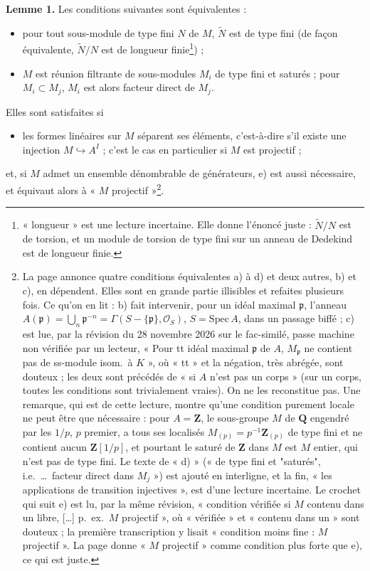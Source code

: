 \documentclass[11pt,a4paper]{article}
\begin{document}
\textbf{Lemme 1.} Les conditions suivantes sont équivalentes :
\begin{itemize}
  \item[a)] pour tout sous-module de type fini $N$ de $M$, $\widetilde{N}$
    est de type fini (de façon équivalente, $\widetilde{N}/N$ est de
    longueur finie\footnote{« longueur » est une lecture incertaine. Elle
    donne l'énoncé juste : $\widetilde{N}/N$ est de torsion, et un module de
    torsion de type fini sur un anneau de Dedekind est de longueur finie.}) ;
  \item[d)] $M$ est réunion filtrante de sous-modules $M_i$ de type fini et
    saturés ; pour $M_i \subset M_j$, $M_i$ est alors facteur direct de
    $M_j$.
\end{itemize}
Elles sont satisfaites si
\begin{itemize}
  \item[e)] les formes linéaires sur $M$ séparent ses éléments,
    c'est-à-dire s'il existe une injection $M \hookrightarrow A^{I}$ ; c'est
    le cas en particulier si $M$ est projectif ;
\end{itemize}
et, si $M$ admet un ensemble dénombrable de générateurs, e) est aussi
nécessaire, et équivaut alors à « $M$ projectif »\footnote{La page annonce
quatre conditions équivalentes a) à d) et deux autres, b) et c), en
dépendent. Elles sont en grande partie illisibles et refaites plusieurs
fois. Ce qu'on en lit : b) fait intervenir, pour un idéal maximal
$\mathfrak{p}$, l'anneau $A(\mathfrak{p}) = \bigcup_n \mathfrak{p}^{-n} =
\Gamma(S - \{\mathfrak{p}\}, \mathcal{O}_S)$, $S = \mathrm{Spec}\,A$, dans un
passage biffé ; c) est lue, par la révision du 28 novembre 2026 sur le fac-similé, passe machine non vérifiée par un lecteur, « Pour tt
idéal maximal $\mathfrak{p}$ de $A$, $M_{\mathfrak{p}}$ ne contient pas de
ss-module isom.\ à $K$ », où « tt » et la négation, très abrégée, sont
douteux ; les deux sont précédés de « si $A$ n'est pas un corps »
(sur un corps, toutes les conditions sont trivialement vraies). On ne les
reconstitue pas. Une remarque, qui est de cette lecture, montre qu'une
condition purement locale ne peut être que nécessaire : pour $A =
\mathbf{Z}$, le sous-groupe $M$ de $\mathbf{Q}$ engendré par les $1/p$,
$p$ premier, a tous ses localisés $M_{(p)} = p^{-1}\mathbf{Z}_{(p)}$ de
type fini et ne contient aucun $\mathbf{Z}[1/p]$, et pourtant le saturé de
$\mathbf{Z}$ dans $M$ est $M$ entier, qui n'est pas de type fini. Le texte
de « d) » (« de type fini et "saturés", i.e.\ \ldots\ facteur direct dans
$M_j$ ») est ajouté en interligne, et la fin, « les applications de
transition injectives », est d'une lecture incertaine. Le crochet qui suit
e) est lu, par la même révision, « condition vérifiée si $M$ contenu dans un
libre, […] p.\ ex.\ $M$ projectif », où « vérifiée » et « contenu dans un »
sont douteux ; la première transcription y lisait « condition moins fine :
$M$ projectif ». La page donne « $M$ projectif » comme condition plus forte
que e), ce qui est juste.}.
\end{document}
